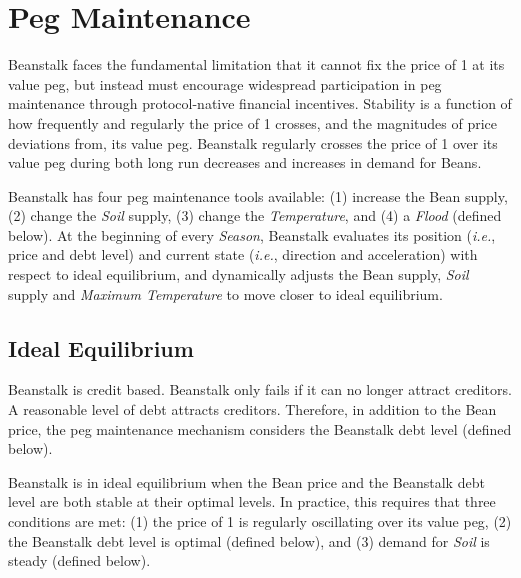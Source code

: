 \documentclass[tikz]{article}
\newcommand{\term}[1]{\textsl{#1}}
\newcommand{\Bean}{} %
\begin{document}
\newpage


\section{Peg Maintenance}
\vspace*{2mm}

Beanstalk faces the fundamental limitation that it cannot fix the price of \Bean1 at its value peg, but instead must encourage widespread participation in peg maintenance through protocol-native financial incentives. Stability is a function of how frequently and regularly the price of \Bean1 crosses, and the magnitudes of price deviations from, its value peg. Beanstalk regularly crosses the price of \Bean1 over its value peg during both long run decreases and increases in demand for Beans.

Beanstalk has four peg maintenance tools available: (1) increase the Bean supply, (2) change the \term{Soil} supply, (3) change the \term{Temperature}, and (4) a \term{Flood} (defined below). At the beginning of every \term{Season}, Beanstalk evaluates its position (\term{i.e.}, price and debt level) and current state (\term{i.e.}, direction and acceleration) with respect to ideal equilibrium, and dynamically adjusts the Bean supply, \term{Soil} supply and \term{Maximum Temperature} to move closer to ideal equilibrium.


\vspace*{2mm}
\subsection{Ideal Equilibrium}
\vspace*{2mm}

Beanstalk is credit based. Beanstalk only fails if it can no longer attract creditors. A reasonable level of debt attracts creditors. Therefore, in addition to the Bean price, the peg maintenance mechanism considers the Beanstalk debt level (defined below). 

Beanstalk is in ideal equilibrium when the Bean price and the Beanstalk debt level are both stable at their optimal levels. In practice, this requires that three conditions are met: (1) the price of \Bean1 is regularly oscillating over its value peg, (2) the Beanstalk debt level is optimal (defined below), and (3) demand for \term{Soil} is steady (defined below). 
\end{document}
